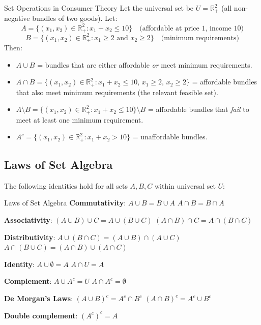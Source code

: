 \documentclass[12pt, a4paper]{article}
\theoremstyle{definition}
\newcommand{\R}{\mathbb{R}}
\begin{document}
\begin{exbox}{Set Operations in Consumer Theory}
Let the universal set be $U = \R^2_+$ (all non-negative bundles of two goods). Let:
\[
  A = \{(x_1, x_2) \in \R^2_+ : x_1 + x_2 \leq 10\} \quad \text{(affordable at price 1, income 10)}
\]
\[
  B = \{(x_1, x_2) \in \R^2_+ : x_1 \geq 2 \text{ and } x_2 \geq 2\} \quad \text{(minimum requirements)}
\]
Then:
\begin{itemize}
  \item $A \cup B$ = bundles that are either affordable \emph{or} meet minimum requirements.
  \item $A \cap B = \{(x_1,x_2)\in\R^2_+: x_1+x_2\leq 10,\, x_1\geq 2,\, x_2\geq 2\}$ = affordable bundles that also meet minimum requirements (the relevant feasible set).
  \item $A \setminus B = \{(x_1,x_2)\in\R^2_+: x_1+x_2\leq 10\} \setminus B$ = affordable bundles that \emph{fail} to meet at least one minimum requirement.
  \item $A^c = \{(x_1,x_2)\in\R^2_+: x_1+x_2 > 10\}$ = unaffordable bundles.
\end{itemize}
\end{exbox}

\subsection{Laws of Set Algebra}

The following identities hold for all sets $A, B, C$ within universal set $U$:

\begin{thmbox}{Laws of Set Algebra}
\textbf{Commutativity}: $A \cup B = B \cup A$ \hfill $A \cap B = B \cap A$

\medskip
\textbf{Associativity}: $(A\cup B)\cup C = A\cup(B\cup C)$ \hfill $(A\cap B)\cap C = A\cap(B\cap C)$

\medskip
\textbf{Distributivity}: $A\cup(B\cap C) = (A\cup B)\cap(A\cup C)$ \hfill $A\cap(B\cup C) = (A\cap B)\cup(A\cap C)$

\medskip
\textbf{Identity}: $A\cup\emptyset = A$ \hfill $A\cap U = A$

\medskip
\textbf{Complement}: $A\cup A^c = U$ \hfill $A\cap A^c = \emptyset$

\medskip
\textbf{De Morgan's Laws}: $(A\cup B)^c = A^c\cap B^c$ \hfill $(A\cap B)^c = A^c\cup B^c$

\medskip
\textbf{Double complement}: $(A^c)^c = A$
\end{thmbox}
\end{document}
